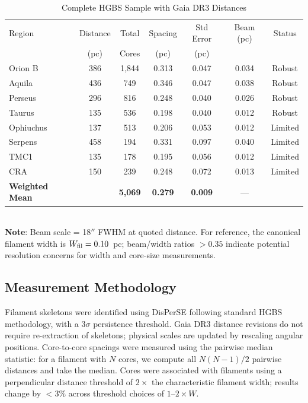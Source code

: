\documentclass[twoside,twocolumn]{mnras}
\begin{document}
\begin{table}
\caption{Complete HGBS Sample with Gaia DR3 Distances}
\label{tab:sample}
\begin{tabular}{lcccccc}
\toprule
Region & Distance & Total & Spacing & Std Error & Beam (pc) & Status \\
       & (pc)   & Cores & (pc)   & (pc)      &  \\
\midrule
Orion B  & 386 & 1,844 & 0.313 & 0.047 & 0.034 & Robust \\
Aquila   & 436 & 749   & 0.346 & 0.047 & 0.038 & Robust \\
Perseus  & 296 & 816   & 0.248 & 0.040 & 0.026 & Robust \\
Taurus   & 135 & 536   & 0.198 & 0.040 & 0.012 & Robust \\
Ophiuchus& 137 & 513   & 0.206 & 0.053 & 0.012 & Limited \\
Serpens  & 458 & 194   & 0.331 & 0.097 & 0.040 & Limited \\
TMC1     & 135 & 178   & 0.195 & 0.056 & 0.012 & Limited \\
CRA      & 150 & 239   & 0.248 & 0.072 & 0.013 & Limited \\
\midrule
\textbf{Weighted Mean} &  & \textbf{5,069} & \textbf{0.279} & \textbf{0.009} & --- &  \\
\bottomrule
\end{tabular}
\\ \footnotesize \textbf{Note}: Beam scale = 18$''$ FWHM at quoted distance. For reference, the canonical filament width is $W_{\rm fil} = 0.10$~pc; beam/width ratios $> 0.35$ indicate potential resolution concerns for width and core-size measurements.
\end{table}

\subsection{Measurement Methodology}

Filament skeletons were identified using DisPerSE \citep{Sousbie2011} following standard
HGBS methodology, with a $3\sigma$ persistence threshold. Gaia DR3 distance revisions
do not require re-extraction of skeletons; physical scales are updated by rescaling
angular positions. Core-to-core spacings were measured using the pairwise median
statistic: for a filament with $N$ cores, we compute all $N(N-1)/2$ pairwise distances
and take the median. Cores were associated with filaments using a perpendicular
distance threshold of $2\times$ the characteristic filament width; results change
by $<3\%$ across threshold choices of $1$--$2\times W$.
\end{document}
